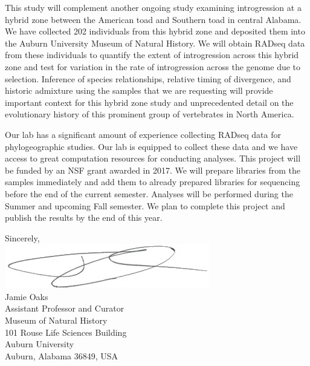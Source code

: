 \documentclass[fontsize=11pt,]{article}
\begin{document}
\vspace{2mm}

This study will complement another ongoing study examining
introgression at a hybrid zone between the American toad and Southern toad in
central Alabama.
We have collected 202 individuals from this hybrid zone and deposited 
them into the Auburn University Museum of Natural History.
We will obtain RADseq data from these individuals to quantify the extent of
introgression across this hybrid zone and test for variation in the rate of
introgression across the genome due to selection.
Inference of species relationships, relative timing of divergence, and historic
admixture using the samples that we are requesting will provide important
context for this hybrid zone study and unprecedented detail on the evolutionary
history of this prominent group of vertebrates in North America.

\vspace{2mm}

Our lab has a significant amount of experience collecting RADseq data for phylogeographic
studies. Our lab is equipped to collect these data and we have access to great 
computation resources for conducting analyses. This project will be funded by an 
NSF grant awarded in 2017. We will prepare libraries from the samples immediately   
and add them to already prepared libraries for sequencing before the end of the
current semester. Analyses will be performed during the Summer and upcoming Fall 
semester. We plan to complete this project and publish the results by the end of 
this year.

Sincerely,\\

\vspace{2mm}
\includegraphics[height=2.0\baselineskip]{jamie_signature.png}\\

Jamie Oaks\\
Assistant Professor and Curator \\
Museum of Natural History\\
101 Rouse Life Sciences Building\\
Auburn University\\
Auburn, Alabama 36849, USA
\end{document}
